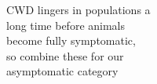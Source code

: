\documentclass[preview]{standalone}
\begin{document}
\begin{center}
CWD lingers in populations a\\long time before animals\\become fully symptomatic,\\so combine these for our\\asymptomatic category
\end{center}
\end{document}
